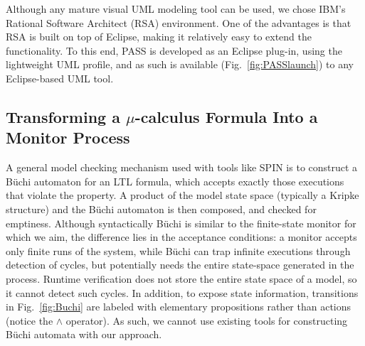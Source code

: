 \documentclass[letter]{llncs}
\begin{document}
Although any mature visual UML modeling tool 
can be used, we chose IBM's Rational Software Architect (RSA) environment.
One of the advantages is that RSA is built on top of Eclipse, making 
it relatively easy to extend the functionality. To this end, PASS is developed as an Eclipse plug-in, using the 
lightweight UML profile, and as such is available (Fig.~\ref{fig:PASSlaunch}) to any Eclipse-based UML tool.

\vspace{-10 pt}
\subsection{Transforming a $\mu$-calculus Formula Into a Monitor Process} 
\vspace{-5 pt}
A general model checking mechanism used with tools like SPIN 
is to construct a B\"uchi automaton for an LTL formula, which accepts exactly those executions
that violate the property. A product of the model state space (typically a Kripke structure) and the B\"uchi automaton is then composed, 
and checked for emptiness. 
Although syntactically B\"uchi is similar to the finite-state monitor for which we aim,
the difference lies in the acceptance conditions: a monitor accepts only 
finite runs of the system, while B\"uchi can trap infinite executions through
detection of cycles, but potentially needs the entire state-space
generated in the process. Runtime verification
does not store the entire state space of a model, so it cannot detect such cycles. 
In addition, to expose state information, transitions in Fig.~\ref{fig:Buchi} are labeled with elementary
propositions rather than actions (notice the $\wedge$ operator). 
As such, we cannot use existing tools for constructing B\"uchi automata with our
approach.
\end{document}
